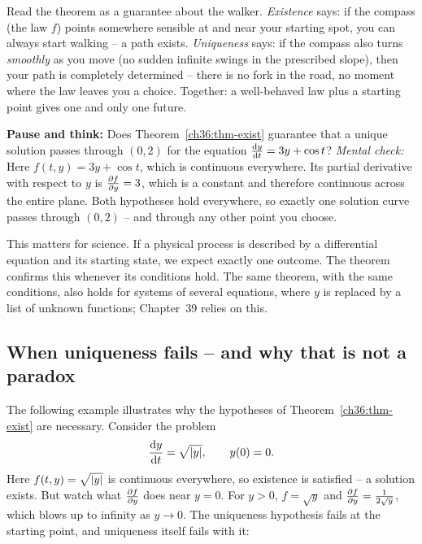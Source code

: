 \begin{intuitionbox}
Read the theorem as a guarantee about the walker. \emph{Existence} says: if the compass (the law $f$) points somewhere sensible at and near your starting spot, you can always start walking -- a path exists. \emph{Uniqueness} says: if the compass also turns \emph{smoothly} as you move (no sudden infinite swings in the prescribed slope), then your path is completely determined -- there is no fork in the road, no moment where the law leaves you a choice. Together: a well-behaved law plus a starting point gives one and only one future.
\end{intuitionbox}

\begin{recoverybox}
\textbf{Pause and think:} Does Theorem~\ref{ch36:thm-exist} guarantee that a unique solution passes through $(0, 2)$ for the equation $\frac{\mathrm{d} y}{\mathrm{d} t} = 3y + \cos t$?
\emph{Mental check:} Here $f(t,y) = 3y + \cos t$, which is continuous everywhere. Its partial derivative with respect to $y$ is $\frac{\partial f}{\partial y} = 3$, which is a constant and therefore continuous across the entire plane. Both hypotheses hold everywhere, so exactly one solution curve passes through $(0,2)$ -- and through any other point you choose.
\end{recoverybox}

This matters for science. If a physical process is described by a differential equation and its starting state, we expect exactly one outcome. The theorem confirms this whenever its conditions hold. The same theorem, with the same conditions, also holds for systems of several equations, where $y$ is replaced by a list of unknown functions; Chapter~39 relies on this.

\subsection{When uniqueness fails -- and why that is not a paradox}

The following example illustrates why the hypotheses of Theorem~\ref{ch36:thm-exist} are necessary. Consider the problem
\[
  \frac{\mathrm{d} y}{\mathrm{d} t} = \sqrt{\lvert y\rvert}, \qquad y(0) = 0.
\]
Here $f(t,y) = \sqrt{\lvert y\rvert}$ is continuous everywhere, so existence is satisfied -- a solution exists. But watch what $\frac{\partial f}{\partial y}$ does near $y=0$. For $y>0$, $f = \sqrt{y}$ and $\frac{\partial f}{\partial y} = \tfrac{1}{2\sqrt{y}}$, which blows up to infinity as $y\to 0$. The uniqueness hypothesis fails at the starting point, and uniqueness itself fails with it:


